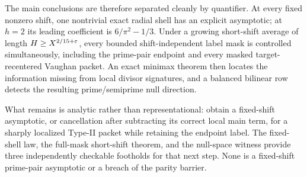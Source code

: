 The main conclusions are therefore separated cleanly by quantifier.
At every fixed nonzero shift, one nontrivial exact radial shell has an
explicit asymptotic; at $h=2$ its leading coefficient is
$6/\pi^2-1/3$.  Under a growing short-shift average of length
$H\geq X^{2/15+\varepsilon}$, every bounded shift-independent label mask is
controlled simultaneously, including the prime-pair endpoint and every
masked target-recentered Vaughan packet.  An exact minimax theorem then
locates the information missing from local divisor signatures, and a
balanced bilinear row detects the resulting prime/semiprime null direction.

What remains is analytic rather than representational: obtain a
fixed-shift asymptotic, or cancellation after subtracting its correct local
main term, for a sharply localized Type-II packet while retaining the
endpoint label.  The fixed-shell law, the full-mask short-shift theorem,
and the null-space witness provide three independently checkable footholds
for that next step.  None is a fixed-shift prime-pair asymptotic or a
breach of the parity barrier.
